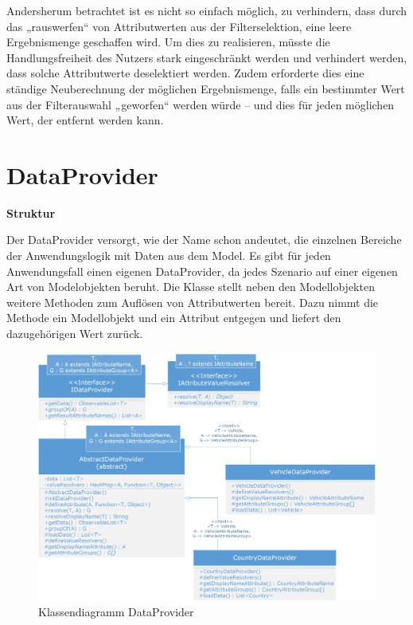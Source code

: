 Andersherum betrachtet ist es nicht so einfach möglich, zu verhindern, dass durch das „rauswerfen“ von Attributwerten aus der Filterselektion, eine leere Ergebnismenge geschaffen wird. Um dies zu realisieren, müsste die Handlungsfreiheit des Nutzers stark eingeschränkt werden und verhindert werden, dass solche Attributwerte deselektiert werden. Zudem erforderte dies eine ständige Neuberechnung der möglichen Ergebnismenge, falls ein bestimmter Wert aus der Filterauswahl „geworfen“ werden würde – und dies für jeden möglichen Wert, der entfernt werden kann.

\section{DataProvider} \label{sec:implDataProvider}
\textbf{Struktur}

Der DataProvider versorgt, wie der Name schon andeutet, die einzelnen Bereiche der Anwendungslogik mit Daten aus dem Model. Es gibt für jeden Anwendungsfall einen eigenen DataProvider, da jedes Szenario auf einer eigenen Art von Modelobjekten beruht. Die Klasse stellt neben den Modellobjekten weitere Methoden zum Auflösen von Attributwerten bereit. Dazu nimmt die Methode ein Modellobjekt und ein Attribut entgegen und liefert den dazugehörigen Wert zurück.

\begin{figure}[H]
 \centering
 \includegraphics[width=1\textwidth]{grafiken/Class_DataProvider.png}
 \caption{Klassendiagramm DataProvider}
 \label{fig:dataProvider1}
\end{figure}

